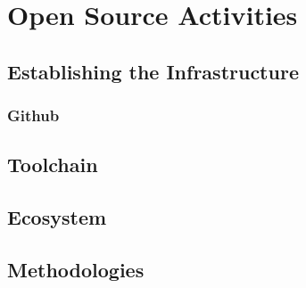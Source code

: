﻿\section{Open Source Activities}\label{sct:open_source}
\tbc[by EclipseSource]

\subsection{Establishing the Infrastructure}

\subsubsection{Github}

\subsection{Toolchain}

\subsection{Ecosystem}

\subsection{Methodologies}
